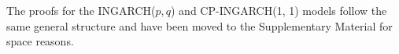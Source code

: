 \documentclass{article}
\begin{document}
%
%
%
%
%
%  




The proofs for the INGARCH($p, q$) and CP-INGARCH(1, 1) models follow the same general structure and have been moved to the Supplementary Material for space reasons. 
\end{document}

